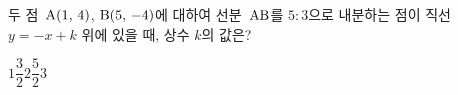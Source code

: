 두 점~$\mathrm{A}(1,\,4)$, $\mathrm{B}(5,\,-4)$에 대하여 선분~$\mathrm{AB}$를 $5:3$으로 내분하는 점이 직선~$y=-x+k$ 위에 있을 때, 상수 $k$의 값은?
\begin{choices32}{$1$}{$\dfrac{3}{2}$}{$2$}{$\dfrac{5}{2}$}{$3$}\end{choices32}
